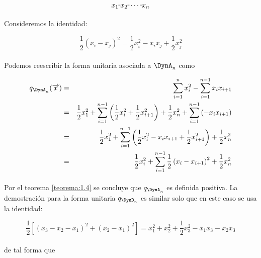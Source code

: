 $$x_{1}\rule[1mm]{.1cm}{0.4pt} x_{2} \rule[1mm]{.1cm}{0.4pt}\cdots\rule[1mm]{.1cm}{0.4pt} x_{n}$$

\paragraph{}
Consideremos  la identidad:

\begin{equation*}
    \frac{1}{2}\left(x_{i} - x_{j}\right)^{2} = \frac{1}{2}x_{i}^{2} - x_{i}x_{j} + \frac{1}{2}x_{j}^{2}
\end{equation*}

\paragraph{}
Podemos reescribir la forma unitaria asociada a $\DynA_{n}$ como

\begin{eqnarray*}
 q_{\DynA_{n}}(\overrightarrow{x}) &  =  & \sum_{i=1}^{n}x_{i}^{2} - \sum_{i=1}^{n-1} x_{i}x_{i+1}\\
 &  =  & \frac{1}{2}x_{1}^{2} + \sum_{i=1}^{n-1}\left(\frac{1}{2}x_{i}^{2} + \frac{1}{2} x_{i+1}^{2}\right) + \frac{1}{2}x_{n}^{2} + \sum_{i=1}^{n-1} \left(-x_{i}x_{i+1}\right)\\
 &  =  & \frac{1}{2}x_{1}^{2} + \sum_{i=1}^{n-1}\left(\frac{1}{2}x_{i}^{2} - x_{i}x_{i+1} + \frac{1}{2}x_{i+1}^{2} \right) + \frac{1}{2}x_{n}^{2}\\
 &  =  & \frac{1}{2}x_{i}^{2} + \sum_{i=1}^{n-1}\frac{1}{2}\left(x_{i} - x_{i+1}\right)^{2} + \frac{1}{2}x_{n}^{2}
\end{eqnarray*}

\paragraph{}
Por el teorema \ref{teorema:1.4} se concluye que $q_{\DynA_{n}}$ es definida positiva. La demostración para la forma unitaria $q_{\DynD_{n}}$ es similar solo que en este caso se usa la identidad:

\begin{equation*}
    \frac{1}{2}\left[\left(x_{3} - x_{2} - x_{1}\right)^{2} + \left(x_{2} - x_{1}\right)^{2}\right] = x_{1}^{2} + x_{2}^{2} + \frac{1}{2}x_{3}^{2} - x_{1}x_{3} - x_{2}x_{3}
\end{equation*}

\paragraph{}
de tal forma que 

